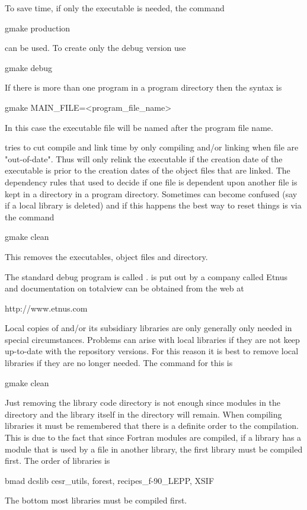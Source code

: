 To save time, if only the  executable is needed, the command
\begin{example}
  gmake production
\end{example}
can be used. To create only the debug version use
\begin{example}
  gmake debug
\end{example}
If there is more than one program in a program directory then the
 syntax is
\begin{example}
  gmake MAIN_FILE=<program_file_name>
\end{example}
In this case the executable file will be named after the program file
name.

 tries to cut compile and link time by only compiling and/or
linking when file are "out-of-date". Thus  will only relink
the executable if the creation date of the executable is prior to the
creation dates of the object files that are linked. The dependency
rules that  used to decide if one file is dependent upon
another file is kept in a  directory in a program
directory. Sometimes  can become confused (say if a local
library is deleted) and if this happens the best way to reset things
is via the command
\begin{example}
  gmake clean
\end{example}
This removes the executables, object files and  directory.

The standard debug program is called .  is
put out by a company called Etnus and documentation on totalview can
be obtained from the web at
\begin{example}
  http://www.etnus.com
\end{example}

Local copies of \bmad and/or its subsidiary libraries are only
generally only needed in special circumstances. Problems can arise
with local libraries if they are not keep up-to-date with the
repository versions. For this reason it is best to remove local
libraries if they are no longer needed. The command for this is
\begin{example}
  gmake clean
\end{example}
Just removing the library code directory is not enough since modules
in the  directory and the library itself in the 
directory will remain. When compiling libraries it must be remembered
that there is a definite order to the compilation. This is due to the
fact that since Fortran modules are compiled, if a library has a
module that is used by a file in another library, the first library
must be compiled first. The order of libraries is
\begin{example}
  bmad
  dcslib
  cesr_utils, forest, recipes_f-90_LEPP, XSIF 
\end{example}
The bottom most libraries must be compiled first.
